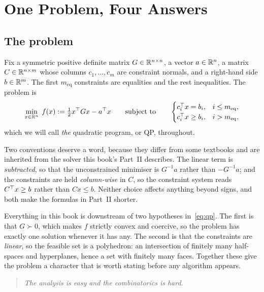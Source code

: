 \chapter{One Problem, Four Answers}
\label{ch:oneproblem}

\section{The problem}

Fix a symmetric positive definite matrix $G \in \mathbb{R}^{n\times n}$, a vector
$a \in \mathbb{R}^n$, a matrix $C \in \mathbb{R}^{n \times m}$ whose columns $c_1,\dots,c_m$ are
constraint normals, and a right-hand side $b \in \mathbb{R}^m$. The first
$m_{\mathrm{eq}}$ constraints are equalities and the rest inequalities. The
problem is
\begin{equation}
  \min_{x \in \mathbb{R}^n} \; f(x) := \tfrac12 x^{\top} G x - a^{\top} x
  \qquad \text{subject to} \qquad
  \begin{cases}
    c_i^{\top} x = b_i, & i \le m_{\mathrm{eq}},\\
    c_i^{\top} x \ge b_i, & i > m_{\mathrm{eq}},
  \end{cases}
  \label{eq:qp}
\end{equation}
which we will call \emph{the} quadratic program, or QP, throughout.

Two conventions deserve a word, because they differ from some textbooks and are
inherited from the solver this book's Part~II describes. The linear term is
\emph{subtracted}, so that the unconstrained minimiser is $G^{-1}a$ rather than
$-G^{-1}a$; and the constraints are held \emph{column-wise} in $C$, so the
constraint system reads $C^{\top} x \ge b$ rather than $Cx \le b$. Neither choice
affects anything beyond signs, and both make the formulas in Part~II shorter.

Everything in this book is downstream of two hypotheses in~\eqref{eq:qp}. The
first is that $G \succ 0$, which makes $f$ strictly convex and coercive, so the
problem has exactly one solution whenever it has any. The second is that the
constraints are \emph{linear}, so the feasible set is a polyhedron: an
intersection of finitely many half-spaces and hyperplanes, hence a set with
finitely many faces. Together these give the problem a character that is worth
stating before any algorithm appears.

\begin{quote}
\emph{The analysis is easy and the combinatorics is hard.}
\end{quote}

